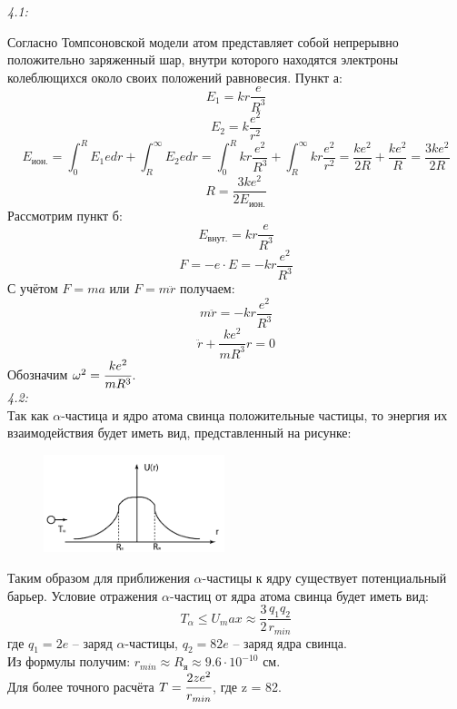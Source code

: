 





	\emph{4.1: }

	Согласно Томпсоновской модели атом представляет собой непрерывно положительно 
	заряженный шар, внутри которого находятся электроны колеблющихся около своих
	положений равновесия.
	Пункт а: \\
		\[ E_1 = kr\frac{e}{R^3} \]
		\[ E_2 = k\frac{e^2}{r^2} \]
		\[ 
			E_\text{ион.} = \int^R_0 E_1 e dr + \int^\infty_R E_2 e dr = 
			\int^R_0 kr\frac{e^2}{R^3} + \int^\infty_R kr\frac{e^2}{r^2} =
			\frac{ke^2}{2R} + \frac{ke^2}{R} = \frac{3ke^2}{2R}
		\]
		\[
			R = \frac{3ke^2}{2E_\text{ион.}}
		\]
	Рассмотрим пункт б: \\
		\[ E_{внут.} = kr\frac{e}{R^3} \]
		\[ F = -e\cdot E = -kr\frac{e^2}{R^3} \]
	С учётом \( F = ma \) или \( F = m\ddot{r} \) получаем:
		\[ m\ddot{r} = -kr\frac{e^2}{R^3} \]
		\[ \ddot{r} + \frac{ke^2}{mR^3}r = 0 \]
	Обозначим \( \omega^2 = \cfrac{ke^2}{mR^3} \). \\

	\emph{4.2: }\\

	Так как \( \alpha \)-частица и ядро атома свинца положительные частицы, то
	энергия их взаимодействия будет иметь вид, представленный на рисунке:

	\begin{figure}[b!]
	    \center
	    \includegraphics[width=0.47\textwidth]{4_2.pdf}
	\end{figure}

	Таким образом для приближения \( \alpha \)-частицы к ядру существует потенциальный
	барьер. Условие отражения \( \alpha \)-частиц от ядра атома свинца будет иметь вид:
		\[ T_\alpha \leq U_max \approx \frac{3}{2}\frac{q_1 q_2}{r_{min}} \]
	где \( q_1 = 2e \) -- заряд \( \alpha \)-частицы, \( q_2 = 82e \) -- заряд ядра свинца. \\
	Из формулы получим: \( r_{min} \approx R_\text{я} \approx 9.6\cdot10^{-10} \) см. \\
	Для более точного расчёта \( T = \cfrac{2ze^2}{r_{min}} \), где z = 82.\\

